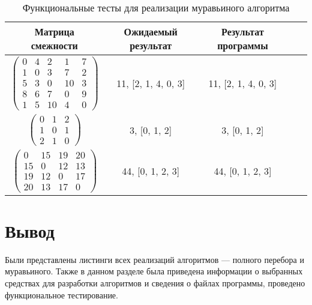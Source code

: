 \begin{center}
	\captionsetup{justification=raggedright,singlelinecheck=off}
	\begin{longtable}[c]{|c|c|c|c|c|}
		\caption{Функциональные тесты для реализации муравьиного алгоритма\label{tbl:functional_test_ants}} \\ \hline
		Матрица смежности & Ожидаемый результат & Результат программы \\
		\hline
		$ \begin{pmatrix}
			0 &  4 &  2 &  1 & 7 \\
			1 &  0 &  3 &  7 & 2 \\
			5 &  3 &  0 & 10 & 3 \\
			8 &  6 & 7 &  0 & 9 \\
			1 &  5 &  10 &  4 & 0
		\end{pmatrix}$ &
		11, [2, 1, 4, 0, 3] &
		11, [2, 1, 4, 0, 3] \\

		$ \begin{pmatrix}
			0 & 1 & 2 \\
			1 & 0 & 1 \\
			2 & 1 & 0
		\end{pmatrix}$ &
		3, [0, 1, 2] &
		3, [0, 1, 2] \\

		$ \begin{pmatrix}
			0 & 15 & 19 & 20 \\
			15 &  0 & 12 & 13 \\
			19 & 12 &  0 & 17 \\
			20 & 13 & 17 &  0
		\end{pmatrix}$ &
		44, [0, 1, 2, 3] &
		44, [0, 1, 2, 3] \\
		\hline
	\end{longtable}
\end{center}

\section*{Вывод}

Были представлены листинги всех реализаций алгоритмов --- полного перебора и муравьиного.
Также в данном разделе была приведена информации о выбранных средствах для разработки алгоритмов и сведения о файлах программы, проведено функциональное тестирование.
